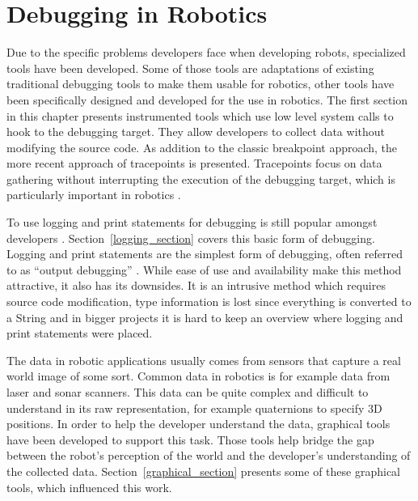 \chapter{Debugging in Robotics}
\label{debugging_in_robotics}

Due to the specific problems developers face when developing robots, specialized tools have been developed. Some of those tools are adaptations of existing traditional debugging tools to make them usable for robotics, other tools have been specifically designed and developed for the use in robotics. The first section in this chapter presents instrumented tools which use low level system calls to hook to the debugging target. They allow developers to collect data without modifying the source code. As addition to the classic breakpoint approach, the more recent approach of tracepoints is presented. Tracepoints focus on data gathering without interrupting the execution of the debugging target, which is particularly important in robotics \cite{Gumbley2009, Gumbley2010, Stallman2002}.

To use logging and print statements for debugging is still popular amongst developers \cite{Murphy2008}. Section~\ref{logging_section} covers this basic form of debugging. Logging and print statements are the simplest form of debugging, often referred to as ``output debugging'' \cite{Gumbley2010}. While ease of use and availability make this method attractive, it also has its downsides. It is an intrusive method which requires source code modification, type information is lost since everything is converted to a String and in bigger projects it is hard to keep an overview where logging and print statements were placed.

The data in robotic applications usually comes from sensors that capture a real world image of some sort. Common data in robotics is for example data from laser and sonar scanners. This data can be quite complex and difficult to understand in its raw representation, for example quaternions to specify 3D positions. In order to help the developer understand the data, graphical tools have been developed to support this task. Those tools help bridge the gap between the robot's perception of the world and the developer's understanding of the collected data. Section~\ref{graphical_section} presents some of these graphical tools, which influenced this work.


